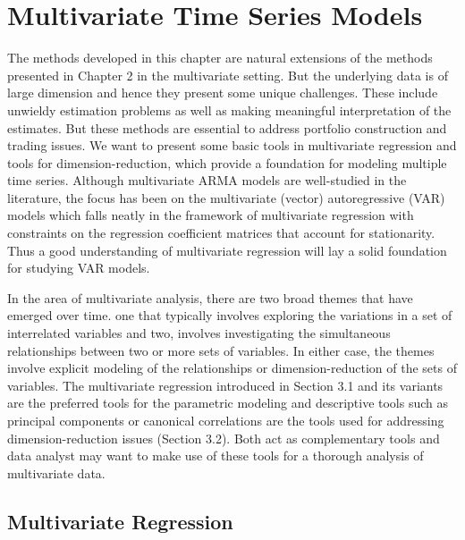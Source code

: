 
\chapter{Multivariate Time Series Models}

The methods developed in this chapter are natural extensions of the methods presented in Chapter 2 in the multivariate setting. But the underlying data is of large dimension and hence they present some unique challenges. These include unwieldy estimation problems as well as making meaningful interpretation of the estimates. But these methods are essential to address portfolio construction and trading issues. We want to present some basic tools in multivariate regression and tools for dimension-reduction, which provide a foundation for modeling multiple time series. Although multivariate ARMA models are well-studied in the literature, the focus has been on the multivariate (vector) autoregressive (VAR) models which falls neatly in the framework of multivariate regression with constraints on the regression coefficient matrices that account for stationarity. Thus a good understanding of multivariate regression will lay a solid foundation for studying VAR models.


In the area of multivariate analysis, there are two broad themes that have emerged over time. one that typically involves exploring the variations in a set of interrelated variables and two, involves investigating the simultaneous relationships between two or more sets of variables. In either case, the themes involve explicit modeling of the relationships or dimension-reduction of the sets of variables. The multivariate regression introduced in Section 3.1 and its variants are the preferred tools for the parametric modeling and descriptive tools such as principal components or canonical correlations are the tools used for addressing dimension-reduction issues (Section 3.2). Both act as complementary tools and data analyst may want to make use of these tools for a thorough analysis of multivariate data. 


\section{Multivariate Regression} 


